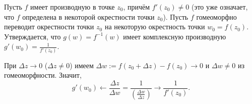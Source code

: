 	\begin{The}
		Пусть $f$ имеет производную в точке $z_0$, причём $f'(z_0)\ne0$ (это уже означает, что $f$ определена в некоторой окрестности точки $z_0$). Пусть $f$ гомеоморфно переводит окрестности точки $z_0$ на некоторую окрестность точки $w_0 = f(z_0)$. Утверждается, что $g(w) = f^{-1}(w)$ имеет комплексную производную $g'(w_0) = \frac1{f'(z_0)}$.
	\end{The}
\begin{Proof}
	При $\Delta z\to 0$ ($\Delta z\ne0$) имеем $\Delta w :=f(z_0+\Delta z) - f(z_0)\to 0$ и $\Delta w\ne0$ из гомеоморфности. Значит,
	\[g'(w_0)\leftarrow \frac{\Delta z}{\Delta w} = \frac1{\left(\frac{\Delta w}{\Delta z}\right)}\to\frac1{f'(z_0)}.\]
\end{Proof}
